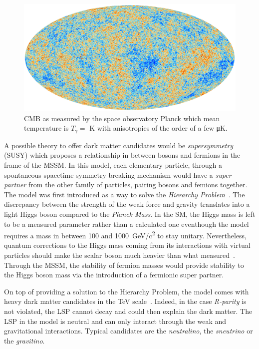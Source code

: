 	\begin{figure}[H]
		\centering
		\includegraphics[width=\plotwidth]{fig/chapt2/CMB.jpg}
		\caption{\label{fig:CMB} \acl{CMB} as measured by the space observatory Planck which mean temperature is $T_\gamma =$ \si{K} with anisotropies of the order of a few \si{\micro K}.}
	\end{figure}
	
	A possible theory to offer dark matter candidates would be \textit{supersymmetry} (SUSY) which proposes a relationship in between bosons and fermions in the frame of the \acf{MSSM}. In this model, each elementary particle, through a spontaneous spacetime symmetry breaking mechanism would have a \textit{super partner} from the other family of particles, pairing bosons and femions together. The model was first introduced as a way to solve the \textit{Hierarchy Problem}~\cite{DIMOPOULOS1981}. The discrepancy between the strength of the weak force and gravity translates into a light Higgs boson compared to the \textit{Planck Mass}. In the SM, the Higgs mass is left to be a measured parameter rather than a calculated one eventhough the model requires a mass in between 100 and \SI{1000}{GeV/c^2} to stay unitary. Nevertheless, quantum corrections to the Higgs mass coming from its interactions with virtual particles should make the scalar boson much heavier than what measured~\cite{TANEDO2012}. Through the MSSM, the stability of fermion masses would provide stability to the Higgs boson mass via the introduction of a fermionic super partner.
	
	On top of providing a solution to the Hierarchy Problem, the model comes with heavy dark matter candidates in the \si{TeV} scale~\cite{JUNGMAN1996}. Indeed, in the case \textit{R-parity} is not violated, the \acf{LSP} cannot decay and could then explain the dark matter. The LSP in the model is neutral and can only interact through the weak and gravitational interactions. Typical candidates are the \textit{neutralino}, the \textit{sneutrino} or the \textit{gravitino}.
	
